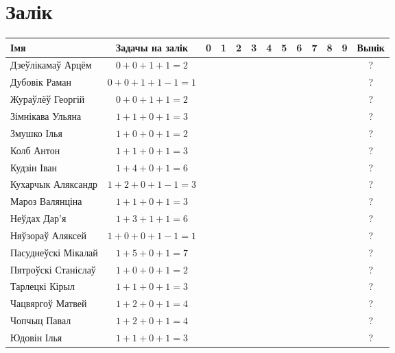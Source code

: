 \documentclass[12pt, a4paper]{extarticle}
\begin{document}
    \section{Залік}
    \begin{table}[H]
        \begin{minipage}{\textwidth}
            \begin{tabular}{|l|c|c|c|c|c|c|c|c|c|c|c|c|}
                \hline
                Імя                 & Задачы на залік &  0  &  1  &  2  &  3  &  4  &  5  &  6  &  7  &  8  &  9  &  Вынік  \\ \hline
                Дзеўлікамаў Арцём   &   $0+0+1+1=2$   &  &  &  &  &  &  &  &  &  &  &  ? \\ \hline
                Дубовік Раман       &  $0+0+1+1-1=1$  &  &  &  &  &  &  &  &  &  &  &  ? \\ \hline
                Жураўлёў Георгій    &   $0+0+1+1=2$   &  &  &  &  &  &  &  &  &  &  &  ? \\ \hline
                Зімнікава Ульяна    &   $1+1+0+1=3$   &  &  &  &  &  &  &  &  &  &  &  ? \\ \hline
                Змушко Ілья         &   $1+0+0+1=2$   &  &  &  &  &  &  &  &  &  &  &  ? \\ \hline
                Колб Антон          &   $1+1+0+1=3$   &  &  &  &  &  &  &  &  &  &  &  ? \\ \hline
                Кудзін Іван         &   $1+4+0+1=6$   &  &  &  &  &  &  &  &  &  &  &  ? \\ \hline
                Кухарчык Аляксандр  &  $1+2+0+1-1=3$  &  &  &  &  &  &  &  &  &  &  &  ? \\ \hline
                Мароз Валянціна     &   $1+1+0+1=3$   &  &  &  &  &  &  &  &  &  &  &  ? \\ \hline
                Неўдах Дар'я        &   $1+3+1+1=6$   &  &  &  &  &  &  &  &  &  &  &  ? \\ \hline
                Няўзораў Аляксей    &  $1+0+0+1-1=1$  &  &  &  &  &  &  &  &  &  &  &  ? \\ \hline
                Пасуднеўскі Мікалай &   $1+5+0+1=7$   &  &  &  &  &  &  &  &  &  &  &  ? \\ \hline
                Пятроўскі Станіслаў &   $1+0+0+1=2$   &  &  &  &  &  &  &  &  &  &  &  ? \\ \hline
                Тарлецкі Кірыл      &   $1+1+0+1=3$   &  &  &  &  &  &  &  &  &  &  &  ? \\ \hline
                Чацвяргоў Матвей    &   $1+2+0+1=4$   &  &  &  &  &  &  &  &  &  &  &  ? \\ \hline
                Чопчыц Павал        &   $1+2+0+1=4$   &  &  &  &  &  &  &  &  &  &  &  ? \\ \hline
                Юдовін Ілья         &   $1+1+0+1=3$   &  &  &  &  &  &  &  &  &  &  &  ? \\ \hline
            \end{tabular}
        \end{minipage}
    \end{table}
\end{document}
